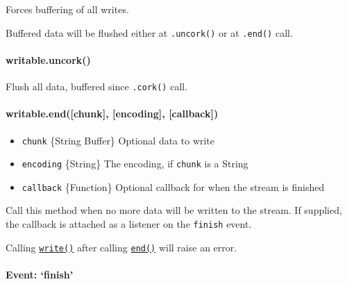 Forces buffering of all writes.

Buffered data will be flushed either at \texttt{.uncork()} or at
\texttt{.end()} call.

\paragraph{writable.uncork()}\label{writable.uncork}

Flush all data, buffered since \texttt{.cork()} call.

\paragraph{writable.end({[}chunk{]}, {[}encoding{]},
{[}callback{]})}\label{writable.endchunk-encoding-callback}

\begin{itemize}
\itemsep1pt\parskip0pt
\item
  \texttt{chunk} \{String \textbar{} Buffer\} Optional data to write
\item
  \texttt{encoding} \{String\} The encoding, if \texttt{chunk} is a
  String
\item
  \texttt{callback} \{Function\} Optional callback for when the stream
  is finished
\end{itemize}

Call this method when no more data will be written to the stream. If
supplied, the callback is attached as a listener on the \texttt{finish}
event.

Calling
\hyperref[streamux5fwritableux5fwriteux5fchunkux5fencodingux5fcallback]{\texttt{write()}}
after calling
\hyperref[streamux5fwritableux5fendux5fchunkux5fencodingux5fcallback]{\texttt{end()}}
will raise an error.

\begin{Shaded}
\begin{Highlighting}[]
\NormalTok{(} 
  \NormalTok{(}\NormalTok{);}
  \NormalTok{(}\NormalTok{);}
\NormalTok{\});}
\end{Highlighting}
\end{Shaded}

\paragraph{Event: `finish'}\label{event-finish}

